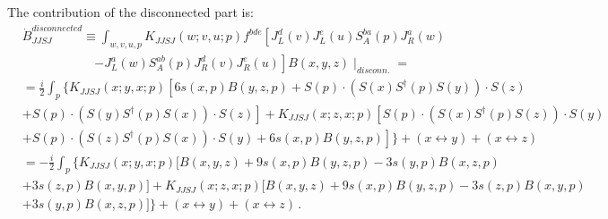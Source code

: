 \documentclass[11pt,a4paper]{article}
\begin{document}
The contribution of the disconnected part is:
 \begin{equation}\begin{split}
&\dot B_{JJSJ}^{disconnected}\equiv
\int_{w,v,u,p}K_{JJSJ}(w;v,u;p)f^{bde}\left[J_{L}^{d}(v)J_{L}^{e}(u)S_{A}^{ba}(p)J_{R}^{a}(w)\right. \\
&\ \ \ \ \ \ \ \ \ \ \ \ \ \ \ \  \ \ \  \ \ \ \ \ \ \ \left. -J_{L}^{a}(w)S_{A}^{ab}(p)J_{R}^{d}(v)J_{R}^{e}(u)\right]B(x,y,z)\mid_{disconn.}=\\
&=\frac{i}{2}\int_{p} \Big\{ K_{JJSJ}(x;y,x;p)\left[ 6 s(x,p) B(y,z,p)+ S(p)\cdot(S(x)S^{\dagger}(p)S(y))\cdot S(z)\right. \\
& \left. +S(p)\cdot(S(y)S^{\dagger}(p)S(x))\cdot S(z)  \right]+K_{JJSJ}(x;z,x;p)\left[S(p)\cdot(S(x)S^{\dagger}(p)S(z))\cdot S(y)\right. \\
&\left.  +S(p)\cdot(S(z)S^{\dagger}(p)S(x))\cdot S(y)+6 s(x,p) B(y,z,p)  \right]\Big\}+\left(x\leftrightarrow y\right)+\left(x\leftrightarrow z\right)\\
&=-\frac{i}{2}\int_{p} \Big\{ K_{JJSJ}(x;y,x;p)[ B(x,y,z) +9s(x,p) B(y,z,p)- 3 s(y,p) B(x,z,p) \\ 
&+ 3s(z,p) B(x,y,p)] +K_{JJSJ}(x;z,x;p)[ B(x,y,z) +9s(x,p) B(y,z,p)- 3 s(z,p) B(x,y,p) \\ 
&+ 3s(y,p) B(x,z,p)]
 \Big\}+\left(x\leftrightarrow y\right)+\left(x\leftrightarrow z\right)\,.\\
 \end{split}\end{equation}
\end{document}
